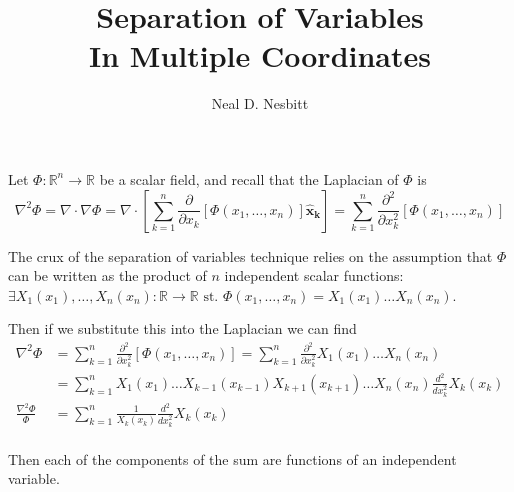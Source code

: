 \documentclass{article}
\title{Separation of Variables\\
In Multiple Coordinates}
\author{Neal D. Nesbitt}
\begin{document}
\maketitle

Let $\Phi:\mathbb{R}^{n}\to\mathbb{R}$ be a scalar field, and recall that the Laplacian of $\Phi$ is
\[ \nabla^{2}\Phi = \nabla \cdot \nabla \Phi = \nabla \cdot \left[ \sum_{k=1}^{n}\frac{\partial}{\partial x_{k}} \left[ \Phi(x_{1},\dots,x_{n}) \right] \mathbf{\hat{x}_{k}} \right] = \sum_{k=1}^{n}\frac{\partial^{2}}{\partial x_{k}^{2}} \left[ \Phi(x_{1},\dots,x_{n}) \right] \]

The crux of the separation of variables technique relies on the assumption that $\Phi$ can be written as the product of $n$ independent scalar functions: $\exists X_{1}(x_{1}),\dots,X_{n}(x_{n}):\mathbb{R}\to\mathbb{R} \text{ st. } \Phi(x_{1},\dots,x_{n}) =  X_{1}(x_{1}) \dots X_{n}(x_{n})$.

Then if we substitute this into the Laplacian we can find
\begin{align*}
\nabla^{2}\Phi &= \sum_{k=1}^{n}\frac{\partial^{2}}{\partial x_{k}^{2}} \left[ \Phi(x_{1},\dots,x_{n}) \right] = \sum_{k=1}^{n}\frac{\partial^{2}}{\partial x_{k}^{2}} X_{1}(x_{1}) \dots X_{n}(x_{n})\\
&= \sum_{k=1}^{n} X_{1}(x_{1}) \dots X_{k-1}(x_{k-1}) X_{k+1}(x_{k+1}) \dots X_{n}(x_{n}) \frac{d^{2}}{dx_{k}^{2}} X_{k}(x_{k})\\
\frac{\nabla^{2}\Phi }{\Phi} &= \sum_{k=1}^{n} \frac{1}{X_{k}(x_{k})} \frac{d^{2}}{dx_{k}^{2}} X_{k}(x_{k})\\
\end{align*}

Then each of the components of the sum are functions of an independent variable.
\end{document}
